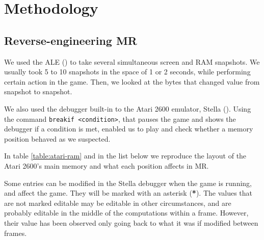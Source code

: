 \chapter{Methodology}
\section{Reverse-engineering \acl{MR}}
We used the \acl{ALE} (\cite{bellemare2013arcade}) to take several simultaneous
screen and \ac{RAM} snapshots. We usually took 5 to 10 snapshots in the space of
1 or 2 seconds, while performing certain action in the game. Then, we looked at
the bytes that changed value from snapshot to snapshot.

We also used the debugger built-in to the Atari 2600 emulator, Stella
(\cite{stella}). Using the command \verb-breakif <condition>-, that pauses the
game and shows the debugger if a condition is met, enabled us to play and check
whether a memory position behaved as we suspected.

In table \ref{table:atari-ram} and in the list below we reproduce the layout of
the Atari 2600's main memory and what each position affects in \acl{MR}.

Some entries can be modified in the Stella debugger when the game is running,
and affect the game. They will be marked with an asterisk (\textbf{*}). The
values that are not marked editable may be editable in other circumstances, and
are probably editable in the middle of the computations within a frame. However,
their value has been observed only going back to what it was if modified between
frames.


